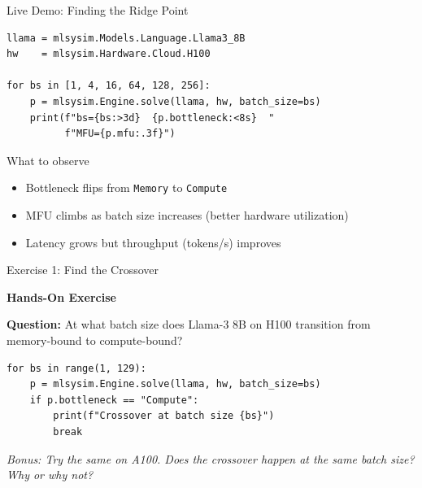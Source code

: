\documentclass[aspectratio=169, 12pt]{beamer}
\begin{document}
\begin{frame}[fragile,shrink=10]{Live Demo: Finding the Ridge Point}

\small
\begin{lstlisting}
llama = mlsysim.Models.Language.Llama3_8B
hw    = mlsysim.Hardware.Cloud.H100

for bs in [1, 4, 16, 64, 128, 256]:
    p = mlsysim.Engine.solve(llama, hw, batch_size=bs)
    print(f"bs={bs:>3d}  {p.bottleneck:<8s}  "
          f"MFU={p.mfu:.3f}")
\end{lstlisting}

\vspace{0.3cm}
\begin{exampleblock}{What to observe}
  \begin{itemize}
    \item Bottleneck flips from \texttt{Memory} to \texttt{Compute}
    \item MFU climbs as batch size increases (better hardware utilization)
    \item Latency grows but throughput (tokens/s) improves
  \end{itemize}
\end{exampleblock}
\end{frame}

\begin{frame}[fragile,shrink=10]{Exercise 1: Find the Crossover}

\centering
\Large\bfseries
Hands-On Exercise\\[0.5cm]
\normalsize

\textbf{Question:} At what batch size does Llama-3 8B on H100
transition from memory-bound to compute-bound?

\vspace{0.3cm}
\begin{lstlisting}
for bs in range(1, 129):
    p = mlsysim.Engine.solve(llama, hw, batch_size=bs)
    if p.bottleneck == "Compute":
        print(f"Crossover at batch size {bs}")
        break
\end{lstlisting}

\vspace{0.3cm}
\textit{Bonus: Try the same on A100. Does the crossover happen
at the same batch size? Why or why not?}
\end{frame}
\end{document}

